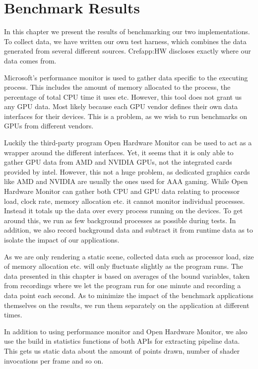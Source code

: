 \chapter{Benchmark Results}\label{ch:test_results}
In this chapter we present the results of benchmarking our two implementations.
To collect data, we have written our own test harness, which combines the data generated from several different sources.
Cref{app:HW} discloses exactly where our data comes from.


Microsoft’s performance monitor is used to gather data specific to the executing process.
This includes the amount of memory allocated to the process, the percentage of total \gls{CPU} time it uses etc.
However, this tool does not grant us any \gls{GPU} data.
Most likely because each \gls{GPU} vendor defines their own data interfaces for their devices.
This is a problem, as we wish to run benchmarks on \glspl{GPU} from different vendors.


Luckily the third-party program Open Hardware Monitor can be used to act as a wrapper around the different interfaces.
Yet, it seems that it is only able to gather \gls{GPU} data from AMD and NVIDIA \glspl{GPU}, not the integrated cards provided by intel.
However, this not a huge problem, as dedicated graphics cards like AMD and NVIDIA are usually the ones used for AAA gaming.
While Open Hardware Monitor can gather both \gls{CPU} and \gls{GPU} data relating to processor load, clock rate, memory allocation etc. it cannot monitor individual processes.
Instead it totals up the data over every process running on the devices. To get around this, we run as few background processes as possible during tests.
In addition, we also record background data and subtract it from runtime data as to isolate the impact of our applications. 


As we are only rendering a static scene, collected data such as processor load, size of memory allocation etc. will only fluctuate slightly as the program runs.
The data presented in this chapter is based on averages of the bound variables, taken from recordings where we let the program run for one minute and recording a data point each second. 
As to minimize the impact of the benchmark applications themselves on the results, we run them separately on the application at different times.


In addition to using performance monitor and Open Hardware Monitor, we also use the build in statistics functions of both \glspl{API} for extracting pipeline data.
This gets us static data about the amount of points drawn, number of shader invocations per frame and so on.


